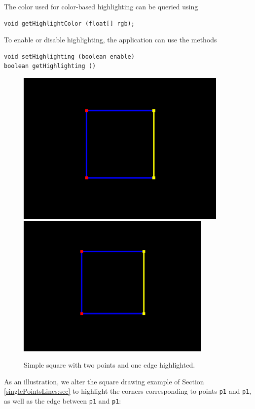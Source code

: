 The color used for color-based highlighting can be queried using
%
\begin{lstlisting}[]
void getHighlightColor (float[] rgb);
\end{lstlisting}
%

To enable or disable highlighting, the application can use
the methods 
%
\begin{lstlisting}[]
void setHighlighting (boolean enable)
boolean getHighlighting ()
\end{lstlisting}
%
\begin{figure}[t]
\begin{center}
\iflatexml
 \includegraphics[]{images/selectedSquare}
\else
 \includegraphics[width=3.75in]{images/selectedSquare}
\fi
\end{center}
\caption{Simple square with two points and one edge highlighted.}
\label{selectedSquare:fig}
\end{figure}
%
As an illustration, we alter the square drawing example of Section
\ref{singlePointsLines:sec} to highlight the corners corresponding
to points {\tt p1} and {\tt p1}, as well as the edge
between {\tt p1} and {\tt p1}:
%
